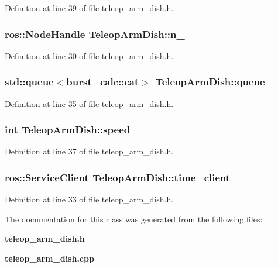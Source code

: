 \-Definition at line 39 of file teleop\-\_\-arm\-\_\-dish.\-h.

\subsubsection[{n\-\_\-}]{\setlength{\rightskip}{0pt plus 5cm}ros\-::\-Node\-Handle {\bf \-Teleop\-Arm\-Dish\-::n\-\_\-}\hspace{0.3cm}{\ttfamily  [private]}}\label{classTeleopArmDish_a7d352245ea446cec76a044ef2111980c}


\-Definition at line 30 of file teleop\-\_\-arm\-\_\-dish.\-h.

\subsubsection[{queue\-\_\-}]{\setlength{\rightskip}{0pt plus 5cm}std\-::queue$<$burst\-\_\-calc\-::cat$>$ {\bf \-Teleop\-Arm\-Dish\-::queue\-\_\-}\hspace{0.3cm}{\ttfamily  [private]}}\label{classTeleopArmDish_ac8ded316a2ed2c47af85a525c97cd7fd}


\-Definition at line 35 of file teleop\-\_\-arm\-\_\-dish.\-h.

\subsubsection[{speed\-\_\-}]{\setlength{\rightskip}{0pt plus 5cm}int {\bf \-Teleop\-Arm\-Dish\-::speed\-\_\-}\hspace{0.3cm}{\ttfamily  [private]}}\label{classTeleopArmDish_a1a2e94ab297615b9c4ba4dc7808207ef}


\-Definition at line 37 of file teleop\-\_\-arm\-\_\-dish.\-h.

\subsubsection[{time\-\_\-client\-\_\-}]{\setlength{\rightskip}{0pt plus 5cm}ros\-::\-Service\-Client {\bf \-Teleop\-Arm\-Dish\-::time\-\_\-client\-\_\-}\hspace{0.3cm}{\ttfamily  [private]}}\label{classTeleopArmDish_af52345768aead77d10975db6857e8f5c}


\-Definition at line 33 of file teleop\-\_\-arm\-\_\-dish.\-h.



\-The documentation for this class was generated from the following files\-:\begin{DoxyCompactItemize}
\item 
{\bf teleop\-\_\-arm\-\_\-dish.\-h}\item 
{\bf teleop\-\_\-arm\-\_\-dish.\-cpp}\end{DoxyCompactItemize}
